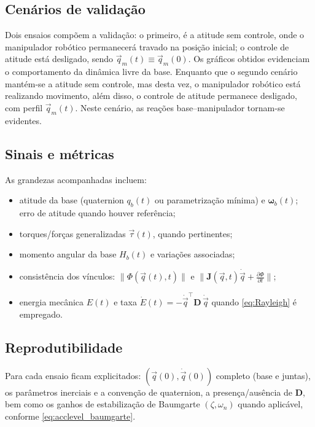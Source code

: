 \subsection{Cenários de validação}
Dois ensaios compõem a validação:
o primeiro, é a atitude sem controle, onde o manipulador robótico permanecerá travado na posição inicial;
o controle de atitude está desligado,
sendo $\vec q_m(t)\equiv \vec q_m(0)$.
Os gráficos obtidos evidenciam o comportamento da dinâmica livre da base.
Enquanto que o segundo cenário mantém-se a atitude sem controle, mas desta vez, o manipulador robótico está realizando movimento, além disso, o controle de atitude permanece desligado, com perfil $\vec q_m(t)$.
Neste cenário, as reações base--manipulador tornam-se evidentes.


\subsection{Sinais e métricas}
As grandezas acompanhadas incluem:
\begin{itemize}
\item atitude da base (quaternion $q_b(t)$ ou parametrização mínima) e $\boldsymbol\omega_b(t)$; erro de atitude quando houver referência;
\item torques/forças generalizadas $\vec\tau(t)$, quando pertinentes;
\item momento angular da base $H_b(t)$ e variações associadas;
\item consistência dos vínculos: $\|\Phi(\vec q(t),t)\|$ e $\big\|\mathbf J(\vec q,t)\dot{\vec q}+\tfrac{\partial \Phi}{\partial t}\big\|$;
\item energia mecânica $E(t)$ e taxa $\dot E(t)=-\dot{\vec q}^{\top}\mathbf D\,\dot{\vec q}$ quando
\eqref{eq:Rayleigh} é empregado.
\end{itemize}

\subsection{Reprodutibilidade}
Para cada ensaio ficam explicitados:
$(\vec q(0),\dot{\vec q}(0))$ completo (base e juntas),
os parâmetros inerciais e a convenção de quaternion,
a presença/ausência de $\mathbf D$,
bem como os ganhos de estabilização de Baumgarte
$(\zeta,\omega_n)$ quando aplicável,
conforme \eqref{eq:acclevel_baumgarte}.
